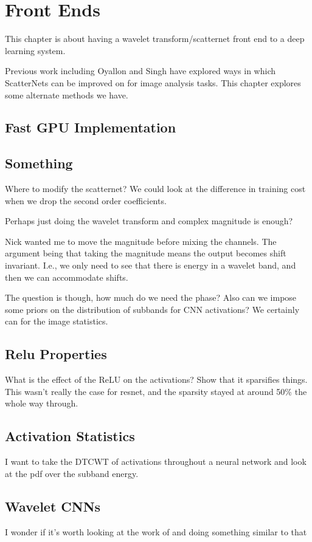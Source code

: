 \chapter{Front Ends}

This chapter is about having a wavelet transform/scatternet front end to a deep
learning system.

Previous work including Oyallon and Singh have explored ways in which
ScatterNets can be improved on for image analysis tasks. This chapter explores
some alternate methods we have.

\section{Fast GPU Implementation}

\section{Something}
Where to modify the scatternet? We could look at the difference in training cost
when we drop the second order coefficients.

Perhaps just doing the wavelet transform and complex magnitude is enough?

Nick wanted me to move the magnitude before mixing the channels. The argument
being that taking the magnitude means the output becomes shift invariant. I.e.,
we only need to see that there is energy in a wavelet band, and then we can
accommodate shifts.

The question is though, how much do we need the phase? Also can we impose some
priors on the distribution of subbands for CNN activations? We certainly can for
the image statistics.

\section{Relu Properties}
What is the effect of the ReLU on the activations? Show that it sparsifies
things. This wasn't really the case for resnet, and the sparsity stayed at around 50\% the whole way
through.

\section{Activation Statistics}
I want to take the DTCWT of activations throughout a neural network and look at
the pdf over the subband energy.

\section{Wavelet CNNs}
I wonder if it's worth looking at the work of \cite{fujieda_wavelet_2018} and doing something
similar to that 


